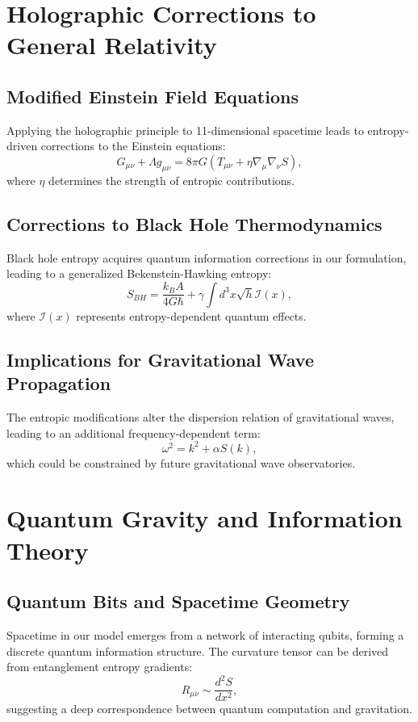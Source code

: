 \documentclass{article}
\begin{document}
\section{Holographic Corrections to General Relativity}

\subsection{Modified Einstein Field Equations}
Applying the holographic principle to 11-dimensional spacetime leads to entropy-driven corrections to the Einstein equations:
\begin{equation}
G_{\mu\nu} + \Lambda g_{\mu\nu} = 8\pi G \left( T_{\mu\nu} + \eta \nabla_\mu \nabla_\nu S \right),
\end{equation}
where $\eta$ determines the strength of entropic contributions.

\subsection{Corrections to Black Hole Thermodynamics}
Black hole entropy acquires quantum information corrections in our formulation, leading to a generalized Bekenstein-Hawking entropy:
\begin{equation}
S_{BH} = \frac{k_B A}{4 G \hbar} + \gamma \int d^3x \sqrt{h} \mathcal{I}(x),
\end{equation}
where $\mathcal{I}(x)$ represents entropy-dependent quantum effects.

\subsection{Implications for Gravitational Wave Propagation}
The entropic modifications alter the dispersion relation of gravitational waves, leading to an additional frequency-dependent term:
\begin{equation}
\omega^2 = k^2 + \alpha S(k),
\end{equation}
which could be constrained by future gravitational wave observatories.

\section{Quantum Gravity and Information Theory}

\subsection{Quantum Bits and Spacetime Geometry}
Spacetime in our model emerges from a network of interacting qubits, forming a discrete quantum information structure. The curvature tensor can be derived from entanglement entropy gradients:
\begin{equation}
R_{\mu\nu} \sim \frac{d^2 S}{dx^2},
\end{equation}
suggesting a deep correspondence between quantum computation and gravitation.
\end{document}
